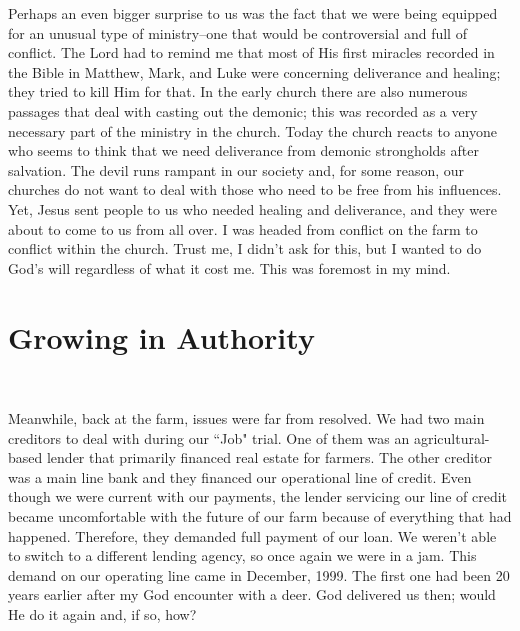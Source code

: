 \documentclass[oneside,12pt]{book}
\begin{document}
Perhaps an even bigger surprise to us was the fact that we were being equipped for an unusual type of ministry--one that would be controversial and full of conflict. The Lord had to remind me that most of His first miracles recorded in the Bible in Matthew, Mark, and Luke were concerning deliverance and healing; they tried to kill Him for that. In the early church there are also numerous passages that deal with casting out the demonic; this was recorded as a very necessary part of the ministry in the church. Today the church reacts to anyone who seems to think that we need deliverance from demonic strongholds after salvation. The devil runs rampant in our society and, for some reason, our churches do not want to deal with those who need to be free from his influences. Yet, Jesus sent people to us who needed healing and deliverance, and they were about to come to us from all over. I was headed from conflict on the farm to conflict within the church. Trust me, I didn't ask for this, but I wanted to do God's will regardless of what it cost me. This was foremost in my mind.


\chapter{Growing in Authority}
\

Meanwhile, back at the farm, issues were far from resolved. We had two main creditors to deal with during our ``Job" trial. One of them was an agricultural-based lender that primarily financed real estate for farmers. The other creditor was a main line bank and they financed our operational line of credit. Even though we were current with our payments, the lender servicing our line of credit became uncomfortable with the future of our farm because of everything that had happened. Therefore, they demanded full payment of our loan. We weren't able to switch to a different lending agency, so once again we were in a jam. This demand on our operating line came in December, 1999. The first one had been 20 years earlier after my God encounter with a deer. God delivered us then; would He do it again and, if so, how?
\end{document}
